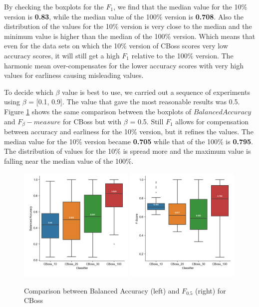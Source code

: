 By checking the boxplots for the $F_{1}$, we find that the median value for the 10\% version is \textbf{0.83}, while the median value of the 100\% version is \textbf{0.708}.
Also the distribution of the values for the 10\% version is very close to the median and the minimum value is higher than the median of the 100\% version.
Which means that even for the data sets on which the 10\% version of CBoss scores very low accuracy scores, it will still get a high $F_{1}$ relative to the 100\% version.
The harmonic mean over-compensates for the lower accuracy scores with very high values for earliness causing misleading values.

To decide which $\beta$ value is best to use, we carried out a sequence of experiments using $\beta$ = [0.1, 0.9].
The value that gave the most reasonable results was 0.5.
Figure \ref{fig:FBeta05} shows the same comparison between the boxplots of $Balanced Accuracy$ and $F_{\beta}-measure$ for CBoss but with $\beta$ = 0.5.
Still $F_{1}$ allows for compensation between accuracy and earliness for the 10\% version, but it refines the values.
The median value for the 10\% version became \textbf{0.705} while that of the 100\% is \textbf{0.795}.
The distribution of values for the 10\% is spread more and the maximum value is falling near the median value of the 100\%.

\begin{figure}[!htbp]
  \captionsetup{justification=raggedright}
  \includegraphics[width=0.49\textwidth,keepaspectratio]{boxplot_accuracy_CBoss.png}
  \includegraphics[width=0.49\textwidth,keepaspectratio]{boxplot_f_score_05_CBoss.png}
  \caption{Comparison between Balanced Accuracy (left) and $F_{0.5}$ (right) for CBoss}
  \label{fig:FBeta05}
\end{figure}

